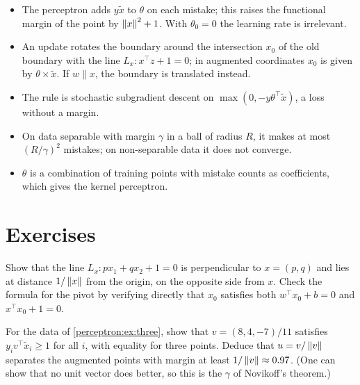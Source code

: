 \begin{notechapter}
\begin{chaptersummary}
\begin{itemize}[nosep]
  \item The perceptron adds $y\tilde x$ to $\theta$ on each mistake; this raises the functional margin
        of the point by $\left\|x\right\|^2 + 1$. With $\theta_0 = 0$ the learning rate is irrelevant.
  \item An update rotates the boundary around the intersection $x_0$ of the old boundary
        with the line $L_x : x^\top z + 1 = 0$; in augmented coordinates $x_0$ is given by $\theta\times\tilde x$. If
        $w\parallel x$, the boundary is translated instead.
  \item The rule is stochastic subgradient descent on $\max(0, -y\theta^\top\tilde x)$, a loss without a margin.
  \item On data separable with margin $\gamma$ in a ball of radius $R$, it makes at most $(R/\gamma)^2$
        mistakes; on non-separable data it does not converge.
  \item $\theta$ is a combination of training points with mistake counts as coefficients, which
        gives the kernel perceptron.
\end{itemize}
\end{chaptersummary}

\section*{Exercises}

\begin{exercise}\label{perceptron:exr:1}
Show that the line $L_x : px_1 + qx_2 + 1 = 0$ is perpendicular to $x = (p, q)$ and lies at distance
$1/\left\|x\right\|$ from the origin, on the opposite side from $x$. Check the formula for the pivot by
verifying directly that $x_0$ satisfies both $w^\top x_0 + b = 0$ and $x^\top x_0 + 1 = 0$.
\end{exercise}

\begin{exercise}\label{perceptron:exr:2}
For the data of \cref{perceptron:ex:three}, show that $v = (8, 4, -7)/11$ satisfies $y_iv^\top\tilde x_i\geq1$ for all $i$,
with equality for three points. Deduce that $u = v/\left\|v\right\|$ separates the augmented points with
margin at least $1/\left\|v\right\|\approx0.97$. (One can show that no unit vector does better, so this is the $\gamma$ of
Novikoff's theorem.)
\end{exercise}


\end{notechapter}
